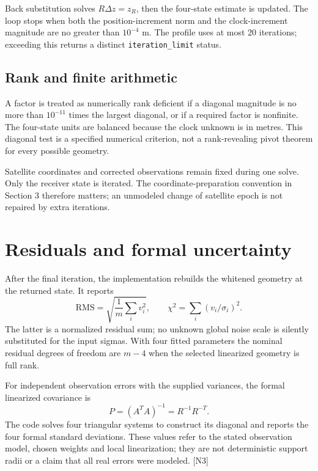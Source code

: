 \documentclass[11pt,a4paper]{article}
\newcommand{\code}[1]{\texttt{#1}}
\begin{document}
Back substitution solves $R\Delta z=z_R$, then the four-state estimate is updated. The loop stops when
both the position-increment norm and the clock-increment magnitude are no greater than $10^{-4}$ m.
The profile uses at most 20 iterations; exceeding this returns a distinct \code{iteration\_limit} status.

\subsection{Rank and finite arithmetic}
A factor is treated as numerically rank deficient if a diagonal magnitude is no more than
$10^{-11}$ times the largest diagonal, or if a required factor is nonfinite. The four-state units are balanced
because the clock unknown is in metres. This diagonal test is a specified numerical criterion, not a
rank-revealing pivot theorem for every possible geometry.

Satellite coordinates and corrected observations remain fixed during one solve. Only the receiver state
is iterated. The coordinate-preparation convention in Section 3 therefore matters; an unmodeled change of
satellite epoch is not repaired by extra iterations.
\clearpage

\section{Residuals and formal uncertainty}
After the final iteration, the implementation rebuilds the whitened geometry at the returned state.
It reports
\begin{equation}
\mathrm{RMS}=\sqrt{\frac1m\sum_i v_i^2},\qquad
\chi^2=\sum_i(v_i/\sigma_i)^2.
\end{equation}
The latter is a normalized residual sum; no unknown global noise scale is silently substituted for the input
sigmas. With four fitted parameters the nominal residual degrees of freedom are $m-4$ when the selected
linearized geometry is full rank.

For independent observation errors with the supplied variances, the formal linearized covariance is
\begin{equation}
P=(A^TA)^{-1}=R^{-1}R^{-T}.
\end{equation}
The code solves four triangular systems to construct its diagonal and reports the four formal standard
deviations. These values refer to the stated observation model, chosen weights and local linearization;
they are not deterministic support radii or a claim that all real errors were modeled. [N3]
\end{document}
